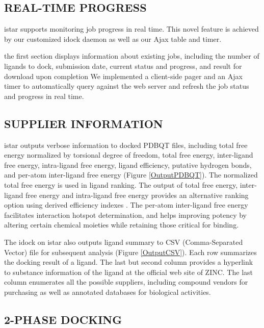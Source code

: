 \documentclass[12pt]{article}
\begin{document}
\subsection*{\sffamily \large REAL-TIME PROGRESS}

istar supports monitoring job progress in real time. This novel feature is achieved by our customized idock daemon as well as our Ajax table and timer.

the first section displays information about existing jobs, including the number of ligands to dock, submission date, current status and progress, and result for download upon completion
We implemented a client-side pager and an Ajax timer to automatically query against the web server and refresh the job status and progress in real time.

\subsection*{\sffamily \large SUPPLIER INFORMATION}

istar outputs verbose information to docked PDBQT files, including total free energy normalized by torsional degree of freedom, total free energy, inter-ligand free energy, intra-ligand free energy, ligand efficiency, putative hydrogen bonds, and per-atom inter-ligand free energy (Figure \ref{OutputPDBQT}). The normalized total free energy is used in ligand ranking. The output of total free energy, inter-ligand free energy and intra-ligand free energy provides an alternative ranking option using derived efficiency indexes \citep{335,336,337}. The per-atom inter-ligand free energy facilitates interaction hotspot determination, and helps improving potency by altering certain chemical moieties while retaining those critical for binding.

The idock on istar also outputs ligand summary to CSV (Comma-Separated Vector) file for subsequent analysis (Figure \ref{OutputCSV}). Each row summarizes the docking result of a ligand. The last but second column provides a hyperlink to substance information of the ligand at the official web site of ZINC. The last column enumerates all the possible suppliers, including compound vendors for purchasing as well as annotated databases for biological activities.

\subsection*{\sffamily \large 2-PHASE DOCKING}
\end{document}
